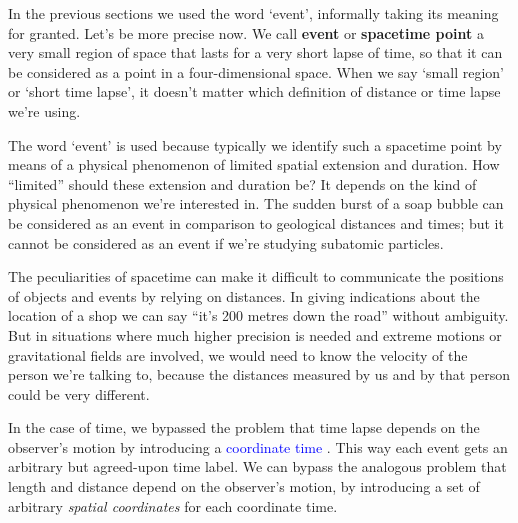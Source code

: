 \documentclass[a4paper,12pt,%
onecolumn,oneside,%
british%
]{memoir}
\renewcommand*{\|}[1][]{\nonscript\:#1\vert\nonscript\:\mathopen{}}
\newcommand*{\sect}{\S}%
\renewcommand*{\autoref}[3][\sect\,\ref]{\textcolor{blue}{#3}
\raisebox{0.6ex}{\color{blue}\miniscule%
\faIcon{angle-right}%
\;#1{#2}\;p.\,\pageref{#2}}}
\begin{document}
In the previous sections we used the word \enquote*{event}, informally taking its meaning for granted. Let's be more precise now. We call \textbf{event} or \textbf{spacetime point} a very small region of space that lasts for a very short lapse of time, so  that it can be considered as a point in a four-dimensional space. When we say \enquote*{small region} or \enquote*{short time lapse}, it doesn't matter which definition of distance or time lapse we're using.

The word \enquote*{event} is used because typically we identify such a spacetime point by means of a physical phenomenon of limited spatial extension and duration. How \enquote{limited} should these extension and duration be? It depends on the kind of physical phenomenon we're interested in. The sudden burst of a soap bubble can be considered as an event in comparison to geological distances and times; but it cannot be considered as an event if we're studying subatomic particles.


\medskip

The peculiarities of spacetime can make it difficult to communicate the positions of objects and events by relying on distances. In giving indications about the location of a shop we can say \enquote{it's 200 metres down the road} without ambiguity. But in situations where much higher precision is needed and extreme motions or gravitational fields are involved, we would need to know the velocity of the person we're talking to, because the distances measured by us and by that person could be very different. %


In the case of time, we bypassed the problem that time lapse depends on the observer's motion by introducing a \autoref{sec:coord_time}{coordinate time}. This way each event gets an arbitrary but agreed-upon time label. We can bypass the analogous problem that length and distance depend on the observer's motion, by introducing a set of arbitrary \emph{spatial coordinates} for each coordinate time.
\end{document}
